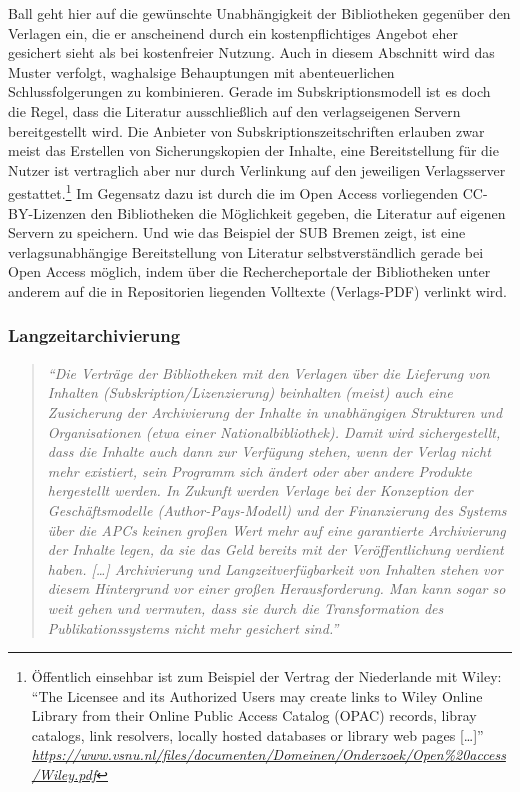\documentclass[a4paper,
fontsize=11pt,
oneside,
numbers=noperiodatend,
parskip=half-,
bibliography=totoc,
final
]{scrartcl}
\begin{document}
Ball geht hier auf die gewünschte Unabhängigkeit der Bibliotheken
gegenüber den Verlagen ein, die er anscheinend durch ein
kostenpflichtiges Angebot eher gesichert sieht als bei kostenfreier
Nutzung. Auch in diesem Abschnitt wird das Muster verfolgt, waghalsige
Behauptungen mit abenteuerlichen Schlussfolgerungen zu kombinieren.
Gerade im Subskriptionsmodell ist es doch die Regel, dass die Literatur
ausschließlich auf den verlagseigenen Servern bereitgestellt wird. Die
Anbieter von Subskriptionszeitschriften erlauben zwar meist das
Erstellen von Sicherungskopien der Inhalte, eine Bereitstellung für die
Nutzer ist vertraglich aber nur durch Verlinkung auf den jeweiligen
Verlagsserver gestattet.\footnote{Öffentlich einsehbar ist zum Beispiel
  der Vertrag der Niederlande mit Wiley: \enquote{The Licensee and its
  Authorized Users may create links to Wiley Online Library from their
  Online Public Access Catalog (OPAC) records, libray catalogs, link
  resolvers, locally hosted databases or library web pages
  {[}\ldots{}{]}}
  \href{https://www.vsnu.nl/files/documenten/Domeinen/Onderzoek/Open\%20access/Wiley.pdf}{\emph{https://www.vsnu.nl/files/documenten/Domeinen/Onderzoek/Open\%20access/Wiley.pdf}}}
Im Gegensatz dazu ist durch die im Open Access vorliegenden
CC-BY-Lizenzen den Bibliotheken die Möglichkeit gegeben, die Literatur
auf eigenen Servern zu speichern. Und wie das Beispiel der SUB Bremen
zeigt, ist eine verlagsunabhängige Bereitstellung von Literatur
selbstverständlich gerade bei Open Access möglich, indem über die
Rechercheportale der Bibliotheken unter anderem auf die in Repositorien
liegenden Volltexte (Verlags-PDF) verlinkt wird.

\subsubsection{Langzeitarchivierung}\label{langzeitarchivierung}

\begin{quote}
\emph{\enquote{Die Verträge der Bibliotheken mit den Verlagen über die
Lieferung von Inhalten (Subskription/Lizenzierung) beinhalten (meist)
auch eine Zusicherung der Archivierung der Inhalte in unabhängigen
Strukturen und Organisationen (etwa einer Nationalbibliothek). Damit
wird sichergestellt, dass die Inhalte auch dann zur Verfügung stehen,
wenn der Verlag nicht mehr existiert, sein Programm sich ändert oder
aber andere Produkte hergestellt werden. In Zukunft werden Verlage bei
der Konzeption der Geschäftsmodelle (Author-Pays-Modell) und der
Finanzierung des Systems über die APCs keinen großen Wert mehr auf eine
garantierte Archivierung der Inhalte legen, da sie das Geld bereits mit
der Veröffentlichung verdient haben. {[}\ldots{}{]} Archivierung und
Langzeitverfügbarkeit von Inhalten stehen vor diesem Hintergrund vor
einer großen Herausforderung. Man kann sogar so weit gehen und vermuten,
dass sie durch die Transformation des Publikationssystems nicht mehr
gesichert sind.}}
\end{quote}
\end{document}
